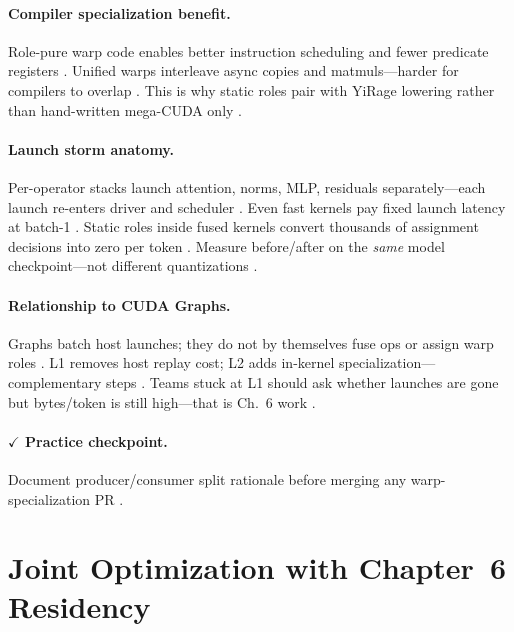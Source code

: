 \paragraph{Compiler specialization benefit.}
Role-pure warp code enables better instruction scheduling and fewer predicate registers \citep{shah2024flashattention3,wu2024mirage}.
Unified warps interleave async copies and matmuls---harder for compilers to overlap \citep{semianalysis2024tma,nvidia2022hopper}.
This is why static roles pair with YiRage lowering rather than hand-written mega-CUDA only \citep{yirage2026,chen2020compilerbasedhardw,mpk2025}.

\paragraph{Launch storm anatomy.}
Per-operator stacks launch attention, norms, MLP, residuals separately---each launch re-enters driver and scheduler \citep{taxbreak2026,patel2025llminference}.
Even fast kernels pay fixed launch latency at batch-1 \citep{memoryfloor2026,kwon2023vllm}.
Static roles inside fused kernels convert thousands of assignment decisions into zero per token \citep{mpk2025,shah2024flashattention3,yirage2026}.
Measure before/after on the \emph{same} model checkpoint---not different quantizations \citep{taxbreak2026,dao2022flashattention}.

\paragraph{Relationship to CUDA Graphs.}
Graphs batch host launches; they do not by themselves fuse ops or assign warp roles \citep{nvidia2024cudagraphs,shah2024flashattention3}.
L1 removes host replay cost; L2 adds in-kernel specialization---complementary steps \citep{patel2025llminference,yirage2026,taxbreak2026}.
Teams stuck at L1 should ask whether launches are gone but bytes/token is still high---that is Ch.~6 work \citep{dao2022flashattention,memoryfloor2026,chen2020compilerbasedhardw}.

\paragraph{$\checkmark$ Practice checkpoint.}
Document producer/consumer split rationale before merging any warp-specialization PR \citep{shah2024flashattention3,yirage2026}.

\section{Joint Optimization with Chapter~6 Residency}
\label{sec:ch07_joint_residency}

